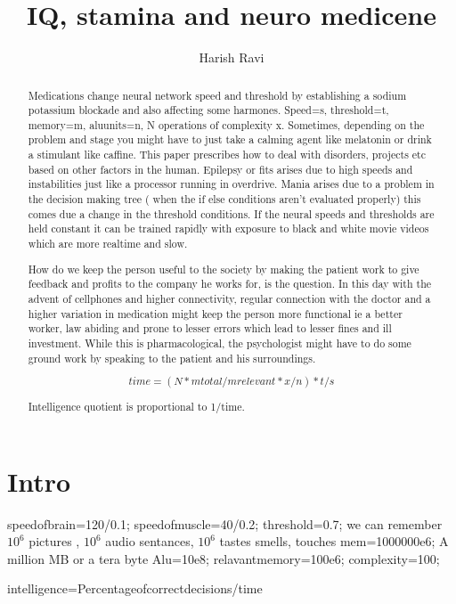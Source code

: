 \documentclass[a4paper]{article}
\title{ IQ, stamina and neuro medicene}
\author{Harish Ravi}
\begin{document}
\maketitle

\begin{abstract}
Medications change neural network speed and threshold by establishing a sodium potassium blockade and also affecting some harmones. Speed=s, threshold=t, memory=m, aluunits=n, N operations of complexity x. Sometimes, depending on the problem and stage you might have to just take a calming agent like melatonin or drink a stimulant like caffine. This paper prescribes how to deal with disorders, projects etc based on other factors in the human. Epilepsy or fits arises due to high speeds and instabilities just like a processor running in overdrive. Mania arises due to a problem in the decision making tree ( when the if else conditions aren't evaluated properly) this comes due a change in the threshold conditions. If the neural speeds and thresholds are held constant it can be trained rapidly with exposure to black and white movie videos which are more realtime and slow.

How do we keep the person useful to the society by making the patient work to give feedback and profits to the company he works for, is the question. In this day with the advent of cellphones and higher connectivity, regular connection with the doctor and a higher variation in medication might keep the person more functional ie a better worker, law abiding and prone to lesser errors which lead to lesser fines and ill investment. While this is pharmacological, the psychologist might have to do some ground work by speaking to the patient and his surroundings.

$$time=(N*mtotal/mrelevant*x/n)*t/s$$

Intelligence quotient is proportional to 1/time.

\end{abstract}

\section{Intro}

speedofbrain=120/0.1;
speedofmuscle=40/0.2;
threshold=0.7;
we can remember $10^6$ pictures , $10^6$ audio sentances, $10^6$ tastes smells, touches
mem=1000000e6;  A million MB or a tera byte
Alu=10e8;
relavantmemory=100e6;
complexity=100;

intelligence=Percentageofcorrectdecisions/time
\end{document}
